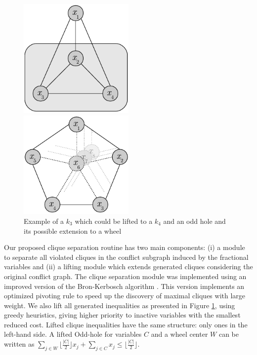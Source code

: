 \documentclass{endm}
\begin{document}
\begin{figure}	
	\begin{minipage}[h]{.5\textwidth}
		\begin{center}
			\includegraphics[width=0.5\textwidth]{clique.pdf}
		\end{center}
	\end{minipage}
	\begin{minipage}[h]{.5\textwidth}
		\begin{center}
			\includegraphics[width=0.5\textwidth]{oddHole.pdf}
		\end{center}
	\end{minipage}
	\caption{Example of a $k_{3}$ which could be lifted to a $k_{4}$    and an odd hole and its possible extension to a wheel} \label{figLiftings}
\end{figure}

Our proposed clique separation routine has two main components: (i) a module to separate all violated cliques in the conflict subgraph induced by the fractional variables and (ii) a lifting module which extends generated cliques considering the original conflict graph. The clique separation module was implemented using an improved version of the Bron-Kerbosch algorithm \cite{Bron1973}. This version implements an optimized pivoting rule \cite{Brito2011} to speed up the discovery of maximal cliques with large weight.  We also lift all generated inequalities as presented in Figure \ref{figLiftings}, using greedy heuristics, giving higher priority to inactive variables with the smallest reduced cost. Lifted clique inequalities have the same structure: only ones in the left-hand side. A lifted Odd-hole for variables $C$ and a wheel center $W$ can be written as $\displaystyle 	\sum_{j \in W} \lfloor \frac{|C|}{2} \rfloor x_{j} + \sum_{j \in C} x_{j} \leq \lfloor \frac{|C|}{2} \rfloor$.
\end{document}
